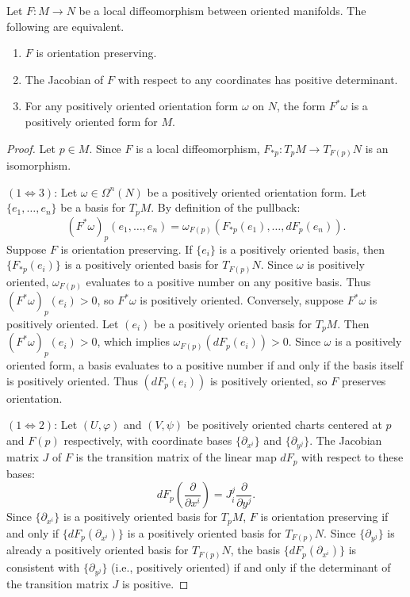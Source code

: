 \begin{proposition}\label{4.2.9}
	Let $F : M \to N$ be a local diffeomorphism between oriented manifolds. The following are equivalent.
	\begin{enumerate}
		\item $F$ is orientation preserving.
		\item The Jacobian of $F$ with respect to any coordinates has positive determinant.
		\item For any positively oriented orientation form $\omega $ on $N$, the form $F^*\omega $ is a positively oriented form for $M$.
	\end{enumerate}
\end{proposition}
\begin{proof}
    Let $p \in M$. Since $F$ is a local diffeomorphism, $F_{*p}  : T_pM \to T_{F(p)}N$ is an isomorphism.

    $(1 \iff 3)$: Let $\omega \in \Omega^n(N)$ be a positively oriented orientation form. Let $\{e_1, \ldots, e_n\}$ be a basis for $T_pM$. By definition of the pullback:
    \[
        (F^*\omega)_p(e_1, \ldots, e_n) = \omega_{F(p)}(F_{*p}(e_1), \ldots, dF_p(e_n)).
    \]
    Suppose $F$ is orientation preserving. If $\{e_i\}$ is a positively oriented basis, then $\{F_{*p}(e_i)\}$ is a positively oriented basis for $T_{F(p)}N$. Since $\omega$ is positively oriented, $\omega_{F(p)}$ evaluates to a positive number on any positive basis. Thus $(F^*\omega)_p(e_i) > 0$, so $F^*\omega$ is positively oriented.
    Conversely, suppose $F^*\omega$ is positively oriented. Let $(e_i)$ be a positively oriented basis for $T_pM$. Then $(F^*\omega)_p(e_i) > 0$, which implies $\omega_{F(p)}(dF_p(e_i)) > 0$. Since $\omega$ is a positively oriented form, a basis evaluates to a positive number if and only if the basis itself is positively oriented. Thus $(dF_p(e_i))$ is positively oriented, so $F$ preserves orientation.

    $(1 \iff 2)$: Let $(U, \varphi)$ and $(V, \psi)$ be positively oriented charts centered at $p$ and $F(p)$ respectively, with coordinate bases $\{\partial_{x^i}\}$ and $\{\partial_{y^j}\}$. The Jacobian matrix $J$ of $F$ is the transition matrix of the linear map $dF_p$ with respect to these bases:
    \[
        dF_p\left(\frac{\partial}{\partial x^i}\right) = J_i^j \frac{\partial}{\partial y^j}.
    \]
    Since $\{\partial_{x^i}\}$ is a positively oriented basis for $T_pM$, $F$ is orientation preserving if and only if $\{dF_p(\partial_{x^i})\}$ is a positively oriented basis for $T_{F(p)}N$.
    Since $\{\partial_{y^j}\}$ is already a positively oriented basis for $T_{F(p)}N$, the basis $\{dF_p(\partial_{x^i})\}$ is consistent with $\{\partial_{y^j}\}$ (i.e., positively oriented) if and only if the determinant of the transition matrix $J$ is positive.
\end{proof}

